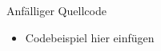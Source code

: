 \begin{frame}{Anfälliger Quellcode}
    \begin{itemize}
        \item Codebeispiel hier einfügen
    \end{itemize}
\end{frame}